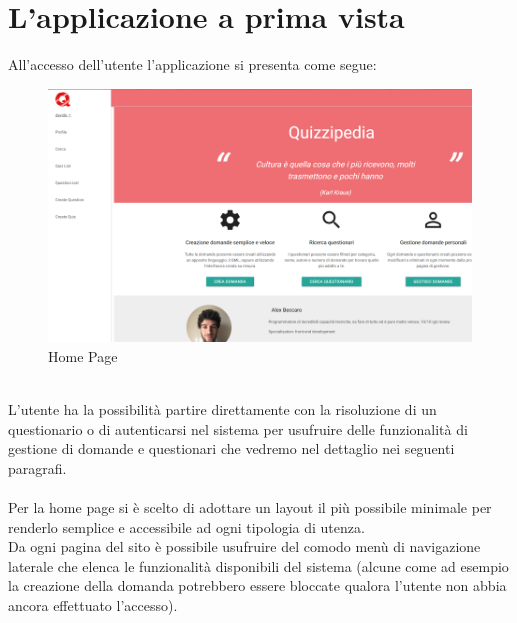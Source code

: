 \documentclass[a4paper,11pt]{article}
\begin{document}
	\section{L'applicazione a prima vista}
	All'accesso dell'utente l'applicazione si presenta come segue:\\
	\begin{figure}[h!]
	\begin{center}
	\includegraphics[scale=0.5]{../images/screen_home.png}
	\caption{Home Page}
	\end{center}
	\end{figure}\\
	L'utente ha la possibilità partire direttamente con la risoluzione di un questionario o di autenticarsi nel sistema per usufruire delle funzionalità di gestione di domande e questionari che vedremo nel dettaglio nei seguenti paragrafi.\\ \\
	Per la home page si è scelto di adottare un layout il più possibile minimale per renderlo semplice e accessibile ad ogni tipologia di utenza.\\
	Da ogni pagina del sito è possibile usufruire del comodo menù di navigazione laterale che elenca le funzionalità disponibili del sistema (alcune come ad esempio la creazione della domanda potrebbero essere bloccate qualora l'utente non abbia ancora effettuato l'accesso).
	\newpage
\end{document}
